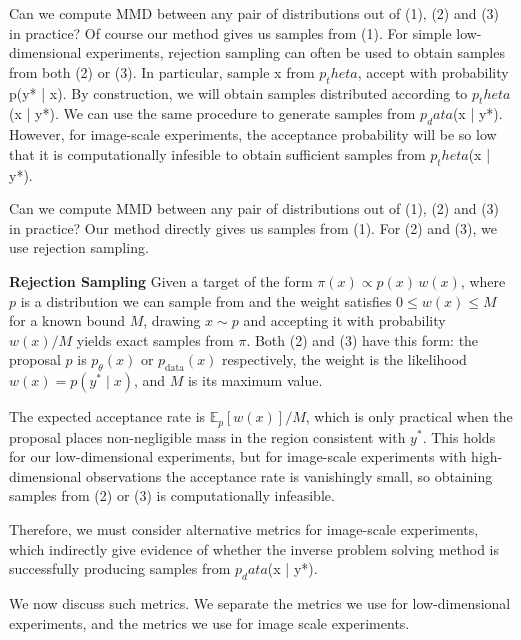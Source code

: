 \documentclass[12pt,a4paper]{report}
\begin{document}
Can we compute MMD between any pair of distributions out of (1), (2) and (3) in practice?
Of course our method gives us samples from (1). 
For simple low-dimensional experiments, rejection sampling can often be used to obtain samples from both (2) or (3). 
In particular, sample x from $p_theta$, accept with probability p(y* | x). By construction, we will obtain samples distributed according to $p_theta$(x | y*). We can use the same procedure to generate samples from $p_data$(x | y*). 
However, for image-scale experiments, the acceptance probability will be so low that it is computationally infesible to obtain sufficient samples from $p_theta$(x | y*). 

Can we compute MMD between any pair of distributions out of (1), (2) and (3) in
practice? 
Our method directly gives us samples from (1). 
For (2) and (3), we use rejection sampling. 

\textbf{Rejection Sampling}
Given a target of the form $\pi(x) \propto p(x)\,w(x)$, where $p$ is a distribution we can sample from and the weight satisfies $0 \le w(x) \le M$ for a known bound $M$, drawing $x \sim p$ and accepting it with probability $w(x)/M$ yields exact samples from
$\pi$. 
Both (2) and (3) have this form: the proposal $p$ is $p_\theta(x)$ or $p_\text{data}(x)$ respectively, the weight is the likelihood $w(x) = p(y^* \mid x)$, and $M$ is its maximum value. 

The expected acceptance rate is $\mathbb{E}_{p}[w(x)]/M$, which is only practical when the proposal
places non-negligible mass in the region consistent with $y^*$. 
This holds for our low-dimensional experiments, but for image-scale experiments with high-dimensional observations the acceptance rate is vanishingly small, so obtaining samples from (2) or (3) is computationally infeasible.

Therefore, we must consider alternative metrics for image-scale experiments, which indirectly give evidence of whether the inverse problem solving method is successfully producing samples from $p_data$(x | y*). 

We now discuss such metrics. We separate the metrics we use for low-dimensional experiments, and the metrics we use for image scale experiments. 
\end{document}
